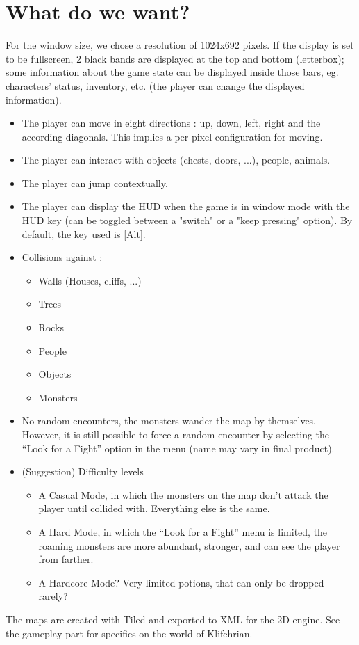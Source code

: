 \documentclass[a4paper,12pt]{book}
\begin{document}
\section*{What do we want?}
For the window size, we chose a resolution of 1024x692 pixels. If the display is set to be fullscreen, 2 black bands are displayed at the top and bottom (letterbox); some information about the game state can be displayed inside those bars, eg. characters' status, inventory, etc. (the player can change the displayed information).
\begin{itemize}
	\item The player can move in eight directions : up, down, left, right and the according diagonals. This implies a per-pixel configuration for moving.
	\item The player can interact with objects (chests, doors, ...), people, animals.
	\item The player can jump contextually.
	\item The player can display the HUD when the game is in window mode with the HUD key (can be toggled between a "switch" or a "keep pressing" option). By default, the key used is [Alt].
	\item Collisions against :
	\begin{itemize}
		\item Walls (Houses, cliffs, ...)
		\item Trees
		\item Rocks
		\item People
		\item Objects
		\item Monsters
	\end{itemize}
	\item No random encounters, the monsters wander the map by themselves. However, it is still possible to force a random encounter by selecting the ``Look for a Fight'' option in the menu (name may vary in final product).
	\item (Suggestion) Difficulty levels
	\begin{itemize}
		\item A Casual Mode, in which the monsters on the map don't attack the player until collided with. Everything else is the same.
		\item A Hard Mode, in which the ``Look for a Fight'' menu is limited, the roaming monsters are more abundant, stronger, and can see the player from farther.
		\item A Hardcore Mode? Very limited potions, that can only be dropped rarely?
	\end{itemize}
\end{itemize}
The maps are created with Tiled and exported to XML for the 2D engine. See the gameplay part for specifics on the world of Klifehrian.
\end{document}
